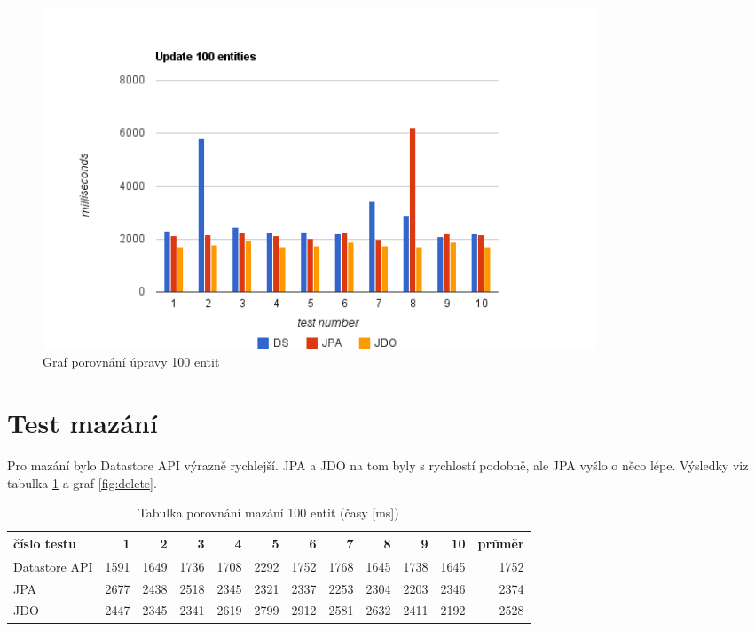 \begin{figure}[h]
\begin{center}
\includegraphics[width=6.5in]{figures/update.png}
\caption{Graf porovnání úpravy 100 entit}
\label{fig:update}
\end{center}
\end{figure}


\section{Test mazání}

Pro mazání bylo Datastore API výrazně rychlejší. JPA a JDO na tom byly s rychlostí podobně, ale JPA vyšlo o něco lépe. Výsledky viz tabulka \ref{tab:delete} a graf \ref{fig:delete}.

\begin{table}[h]
\centering
\caption[Tabulka porovnání mazání 100 entit]{Tabulka porovnání mazání 100 entit (časy [ms])}\label{tab:delete}
\begin{tabular}{|l|r|r|r|r|r|r|r|r|r|r|r|}
   \hline
číslo testu	& 1		& 2		& 3		& 4		& 5		& 6		& 7		& 8		& 9		& 10		& průměr \\
   \hline
Datastore API	& 1591	& 1649	& 1736	& 1708	& 2292	& 1752	& 1768	& 1645	& 1738	& 1645	& 1752 \\
JPA	& 2677	& 2438	& 2518	& 2345	& 2321	& 2337	& 2253	& 2304	& 2203	& 2346	& 2374 \\
JDO	& 2447	& 2345	& 2341	& 2619	& 2799	& 2912	& 2581	& 2632	& 2411	& 2192	& 2528 \\
   \hline
\end{tabular}
\end{table}

